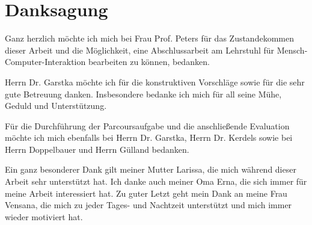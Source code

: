 \cleardoublepage
\chapter*{Danksagung}
\pagestyle{myheadings}
\markboth{}{}
\normalsize
Ganz herzlich möchte ich mich bei Frau Prof. Peters für das Zustandekommen dieser Arbeit und die Möglichkeit, eine Abschlussarbeit am Lehrstuhl für Mensch-Computer-Interaktion bearbeiten zu können, bedanken.

Herrn Dr. Garstka möchte ich für die konstruktiven Vorschläge sowie für die sehr gute Betreuung danken. Insbesondere bedanke ich mich für all seine Mühe, Geduld und Unterstützung.

Für die Durchführung der Parcoursaufgabe und die anschließende Evaluation möchte ich mich ebenfalls bei Herrn Dr. Garstka, Herrn Dr. Kerdels sowie bei Herrn Doppelbauer und Herrn Gülland bedanken.

Ein ganz besonderer Dank gilt meiner Mutter Larissa, die mich während dieser Arbeit sehr unterstützt hat. Ich danke auch meiner Oma Erna, die sich immer für meine Arbeit interessiert hat. 
Zu guter Letzt geht mein Dank an meine Frau Vensana, die mich zu jeder Tages- und Nachtzeit unterstützt und mich immer wieder motiviert hat.


